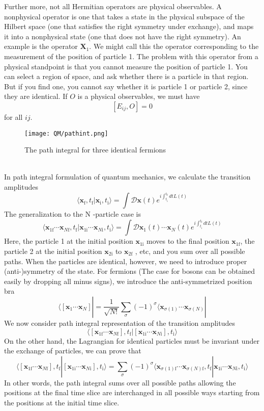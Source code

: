 \documentclass[cyan]{elegantnote}
\begin{document}
Further more, not all Hermitian operators are physical observables. A nonphysical operator is one that takes a state
in the physical subspace of the Hilbert space (one that satisfies the right symmetry under exchange), and maps it into a nonphysical state (one that does not have the right symmetry).
An example is the operator $\bm{X}_1$. We might call this the operator corresponding to the measurement of the position of
particle 1. 
The problem with this operator from a physical standpoint is that you cannot measure the position of particle 1. You can select a region of space, and ask whether there is a particle in that region. But if you find one, you cannot say whether it is particle 1 or particle 2, since they are identical. 
If $O$ is a physical observables, we must have
\[[E_{ij},O] = 0\]
for all $ij$.
\begin{figure}[!h]
	\centering
	\texttt{[image: QM/pathint.png]}
	\caption{The path integral for three identical fermions}
\end{figure}\\
In path integral formulation of quantum mechanics, we calculate the transition amplitudes
\[\langle \bm{x}_{\mathrm{f}},t_{\mathrm{f}} | \bm{x}_{\mathrm{i}},t_{\mathrm{i}}\rangle = \int \mathcal{D}\bm{x}(t) e^{i\int_{t_{\mathrm{i}}}^{t_{\mathrm{f}}} dt L(t)}\]
The generalization to the N -particle case is
\[\langle \bm{x}_{1\mathrm{f}}\cdots\bm{x}_{N\mathrm{f}},t_{\mathrm{f}} | \bm{x}_{1\mathrm{i}}\cdots\bm{x}_{N\mathrm{i}},t_{\mathrm{i}}\rangle = \int \mathcal{D}\bm{x}_1(t)\cdots\bm{x}_N(t) e^{i\int_{t_{\mathrm{i}}}^{t_{\mathrm{f}}} dt L(t)}\]
Here, the particle 1 at the initial position $\bm{x}_{1\mathrm{i}}$ moves to the final position $\bm{x}_{1\mathrm{f}}$, the particle 2 at the initial position $\bm{x}_{2\mathrm{i}}$ to $\bm{x}_{2\mathrm{f}}$ , etc, and you sum over all possible paths.
When the particles are identical, however, we need to introduce proper (anti-)symmetry of the state. For fermions (The case for bosons can be obtained easily by dropping all minus signs), we introduce the anti-symmetrized position bra
\[\langle [\bm{x}_1\cdots\bm{x}_N]| = \frac{1}{\sqrt{N!}} \sum_{\sigma} (-1)^{\sigma} \langle \bm{x}_{\sigma(1)}\cdots\bm{x}_{\sigma(N)}|\]
We now consider path integral representation of the transition amplitudes
\[\langle [\bm{x}_{1\mathrm{f}}\cdots\bm{x}_{N\mathrm{f}}],t_{\mathrm{f}} | [\bm{x}_{1\mathrm{i}}\cdots\bm{x}_{N\mathrm{i}}],t_{\mathrm{i}}\rangle\]
On the other hand, the Lagrangian for identical particles must be invariant under the exchange of particles, we can prove that
\[\langle [\bm{x}_{1\mathrm{f}}\cdots\bm{x}_{N\mathrm{f}}],t_{\mathrm{f}} | [\bm{x}_{1\mathrm{i}}\cdots\bm{x}_{N\mathrm{i}}],t_{\mathrm{i}}\rangle = \sum_{\sigma} (-1)^{\sigma}  \langle \bm{x}_{\sigma(1)\mathrm{f}}\cdots\bm{x}_{\sigma(N)\mathrm{f}},t_{\mathrm{f}} | \bm{x}_{1\mathrm{i}}\cdots\bm{x}_{N\mathrm{i}},t_{\mathrm{i}}\rangle\]
In other words, the path integral sums over all possible paths allowing the positions at the final time slice are interchanged in all possible ways starting from the positions at the initial time slice.
\end{document}

